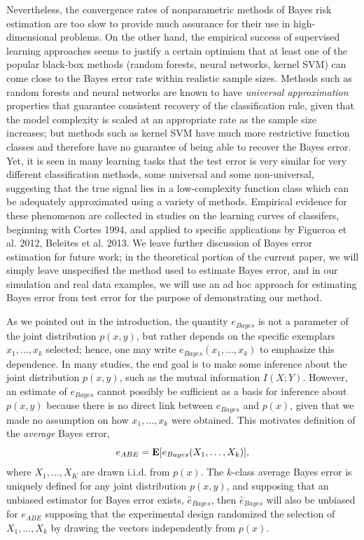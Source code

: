 \documentclass[12pt]{article}
\begin{document}
Nevertheless, the convergence rates of nonparametric methods of Bayes risk estimation are too slow to provide much assurance
for their use in high-dimensional problems.  On the other hand, the empirical success of supervised learning approaches seems
to justify a certain optimism that at least one of the popular black-box methods (random forests, neural networks, kernel SVM)
can come close to the Bayes error rate within realistic sample sizes.  Methods such as random forests and neural networks
are known to have \emph{universal approximation} properties that guarantee consistent recovery of the classification rule,
given that the model complexity is scaled at an appropriate rate as the sample size increases; but methods such as kernel SVM
have much more restrictive function classes and therefore have no guarantee of being able to recover the Bayes error.
Yet, it is seen in many learning tasks that the test error is very similar for very different classification methods, 
some universal and some non-universal, suggesting that the true signal lies in a low-complexity function class which can
be adequately approximated using a variety of methods.  Empirical evidence for these phenomenon are collected in studies
on the learning curves of classifers, beginning with Cortes 1994, and applied to specific applications by Figueroa et al. 2012, Beleites et al. 2013.
We leave further discussion of Bayes error estimation for future work; in the theoretical portion of the current paper,
we will simply leave unspecified the method used to estimate Bayes error, and in our simulation and real data examples,
we will use an ad hoc approach for estimating Bayes error from test error for the purpose of demonstrating our method.

As we pointed out in the introduction, the quantity $e_{Bayes}$ is not a parameter of the joint distribution $p(x, y)$,
but rather depends on the specific exemplars $x_1,\hdots, x_k$ selected;
hence, one may write $e_{Bayes}(x_1,\hdots, x_k)$ to emphasize this dependence.
In many studies, the end goal is to make some inference about the joint distribution $p(x, y)$, such as the mutual information $I(X; Y)$.
However, an estimate of $e_{Bayes}$ cannot possibly be sufficient as a basis for inference about $p(x, y)$ because
there is no direct link between $e_{Bayes}$ and $p(x)$, given that we made no assumption on how $x_1,\hdots, x_k$ were obtained.
This motivates definition of the \emph{average} Bayes error,
\[
e_{ABE} = \textbf{E}[e_{Bayes}(X_1,\hdots, X_k)],
\]
where $X_1,\hdots, X_K$ are drawn i.i.d. from $p(x)$.
The $k$-class average Bayes error is uniquely defined for any joint distribution $p(x, y)$,
and supposing that an unbiased estimator for Bayes error exists, $\hat{e}_{Bayes}$,
then $\hat{e}_{Bayes}$ will also be unbiased for $e_{ABE}$ supposing that the experimental design randomized the selection of $X_1,\hdots, X_k$
by drawing the vectors independently from $p(x)$.
\end{document}
